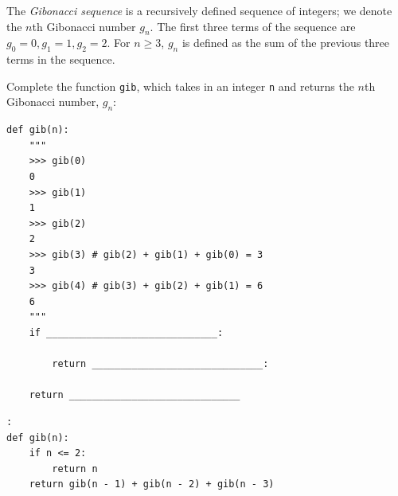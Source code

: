 \begin{blocksection}
\question The \textit{Gibonacci sequence} is a recursively defined sequence of integers; we denote the $n$th Gibonacci number $g_n$. The first three terms of the sequence are $g_0 = 0, g_1 = 1, g_2 = 2$. For $n \geq 3$, $g_n$ is defined as the sum of the previous three terms in the sequence. 

Complete the function \lstinline{gib}, which takes in an integer \lstinline{n} and returns the $n$th Gibonacci number, $g_n$: 

\begin{lstlisting}
def gib(n):
    """
    >>> gib(0)
    0
    >>> gib(1)
    1
    >>> gib(2)
    2
    >>> gib(3) # gib(2) + gib(1) + gib(0) = 3
    3
    >>> gib(4) # gib(3) + gib(2) + gib(1) = 6
    6
    """
    if ______________________________:

        return ______________________________:
        
    return ______________________________
\end{lstlisting}

\begin{solution}[0in]
\begin{lstlisting}:
def gib(n):
    if n <= 2:
        return n
    return gib(n - 1) + gib(n - 2) + gib(n - 3)
\end{lstlisting}
\end{solution}
\end{blocksection}

